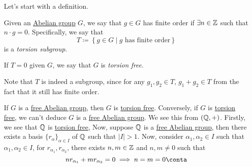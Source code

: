 Let's start with a definition.

\begin{definition}\label{def:torsion-subgroup}
	Given an \hyperref[def:Abelian-group]{Abelian group} \(G\), we say that \(g\in G\) has finite order if \(\exists n\in \mathbb{\MakeUppercase{z}} \) such that
	\(n\cdot g = 0\). Specifically, we say that
	\[
		T\coloneqq \left\{g\in G\mid g\text{ has finite order}\right\}
	\]
	is a \emph{torsion subgroup}.

	If \(T= 0\) given \(G\), we say that \(G\) is \emph{torsion free}.\label{def:torsion-free}
\end{definition}
\begin{note}
	Note that \(T\) is indeed a subgroup, since for any \(g_1, g_2\in T\), \(g_1 + g_2\in T\) from the fact that it still has finite order.
\end{note}

\begin{remark}
	If \(G\) is a \hyperref[def:free-Abelian-group]{free Abelian group}, then \(G\) is \hyperref[def:torsion-free]{torsion free}. Conversely, if \(G\) is
	\hyperref[def:torsion-free]{torsion free}, we can't deduce \(G\) is a \hyperref[def:free-Abelian-group]{free Abelian group}. We see this from
	\((\mathbb{\MakeUppercase{q}} , +)\). Firstly, we see that \(\mathbb{\MakeUppercase{q}} \) is \hyperref[def:torsion-free]{torsion free},
	Now, suppose \(\mathbb{\MakeUppercase{q}} \) is a \hyperref[def:free-Abelian-group]{free Abelian group}, then there exists a basis \(\{r_\alpha \}_{\alpha \in I}\)
	of \(\mathbb{\MakeUppercase{q}} \) such that \(\left\vert I \right\vert > 1\). Now, consider \(\alpha _1, \alpha _2\in I\) such that \(\alpha _1, \alpha _2\in I\), for
	\(r_{\alpha _1}, r_{\alpha _2}\), there exists \(n, m\in \mathbb{\MakeUppercase{z}} \) and \(n, m\neq 0\) such that
	\[
		n r_{\alpha _1} + m r_{\alpha _2} = 0 \implies n = m = 0\conta
	\]
\end{remark}

